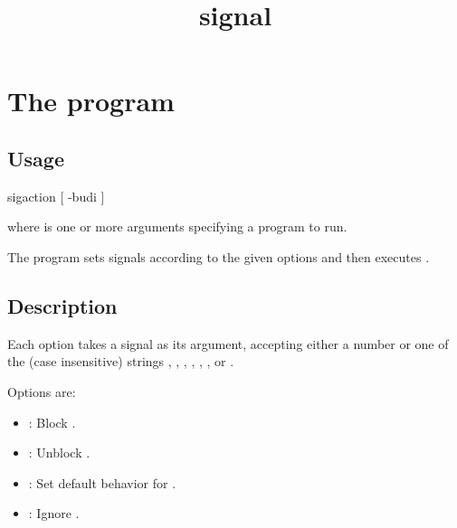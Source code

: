 \documentclass{book}
\title{signal}
\begin{document}
\section{The  program}

\subsection{Usage}
\begin{code}%
  sigaction [ -budi  ] 
\end{code}
where  is one or more arguments specifying a program to run.

The  program sets signals according to the given options and then
executes .

\subsection{Description}
Each option takes a signal as its argument, accepting either a number or one of
the (case insensitive) strings , , , ,
, , or . 

Options are:
\begin{itemize}
\item {}: Block .
\item {}: Unblock .
\item {}: Set default behavior for .
\item {}: Ignore .
\end{itemize}
\end{document}
